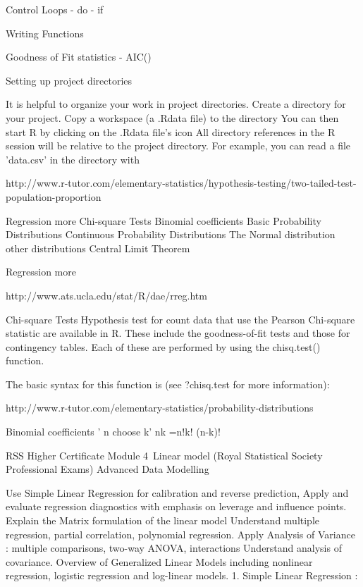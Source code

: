\documentclass[a4paper,12pt]{article}
\begin{document}
Control Loops
 - do 
 - if 

Writing Functions

Goodness of Fit statistics
 - AIC()




Setting up project directories

It is helpful to organize your work in project directories.
Create a directory for your project.
Copy a workspace (a .Rdata file) to the directory
You can then start R by clicking on the .Rdata file's icon
All directory references in the R session will be relative to the project directory. For example, you can read a file 'data.csv' in the directory with


 
http://www.r-tutor.com/elementary-statistics/hypothesis-testing/two-tailed-test-population-proportion
 

Regression more
Chi-square Tests
Binomial coefficients
Basic Probability Distributions
Continuous Probability Distributions
The Normal distribution
other distributions
Central Limit Theorem

Regression more

http://www.ats.ucla.edu/stat/R/dae/rreg.htm


 

Chi-square Tests
Hypothesis test for count data that use the Pearson Chi-square statistic are available in R.
These include the goodness-of-fit tests and those for contingency tables. Each of these are
performed by using the chisq.test() function. 

The basic syntax for this function is (see ?chisq.test for more information): 
 
http://www.r-tutor.com/elementary-statistics/probability-distributions




Binomial coefficients
' n choose k'
nk =n!k! (n-k)!

RSS Higher Certificate Module 4 Linear model
(Royal Statistical Society Professional Exams)
Advanced Data Modelling

Use Simple Linear Regression for calibration and reverse prediction,
Apply and evaluate regression diagnostics with emphasis on leverage and influence points.
Explain the Matrix formulation of the linear model
Understand multiple regression, partial correlation, polynomial regression.
Apply Analysis of Variance : multiple comparisons, two-way ANOVA, interactions
Understand analysis of covariance.
Overview of Generalized Linear Models including nonlinear regression, logistic regression and log-linear models.
1. Simple Linear Regression :
\end{document}
